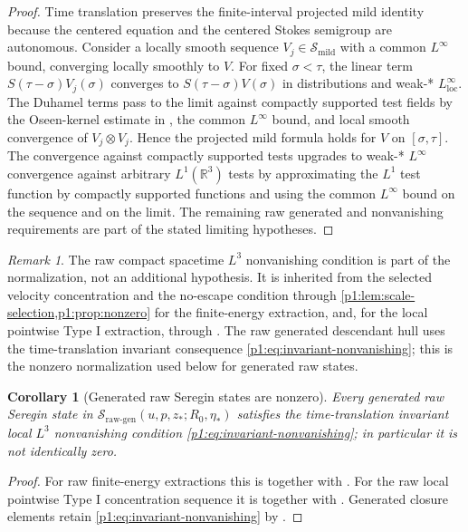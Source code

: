 \documentclass[11pt]{amsart}
\theoremstyle{plain}
\newtheorem{corollary}[corollary]{Corollary}
\theoremstyle{definition}
\theoremstyle{remark}
\newtheorem{remark}[remark]{Remark}
\numberwithin{equation}{section}
\newcommand{\R}{\mathbb R}
\newcommand{\loc}{\mathrm{loc}}
\newcommand{\calS}{\mathcal S}
\begin{document}
\begin{proof}
Time translation preserves the finite-interval projected mild identity because
the centered equation and the centered Stokes semigroup are autonomous.
Consider a locally smooth sequence \(V_j\in\calS_{\mathrm{mild}}\) with a common
\(L^\infty\) bound, converging locally smoothly to \(V\).  For fixed
\(\sigma<\tau\), the linear term \(S(\tau-\sigma)V_j(\sigma)\) converges to
\(S(\tau-\sigma)V(\sigma)\) in distributions and weak-* \(L^\infty_{\loc}\).
The Duhamel terms pass to the limit against compactly supported test fields by
the Oseen-kernel estimate in , the common
\(L^\infty\) bound, and local smooth convergence of \(V_j\otimes V_j\).  Hence
the projected mild formula holds for \(V\) on \([\sigma,\tau]\).  The
convergence against compactly supported tests upgrades to weak-* \(L^\infty\)
convergence against arbitrary \(L^1(\R^3)\) tests by approximating the
\(L^1\) test function by compactly supported functions and using the common
\(L^\infty\) bound on the sequence and on the limit.  The remaining
raw generated and nonvanishing requirements are part of the stated limiting
hypotheses.
\end{proof}

\begin{remark}
The raw compact spacetime \(L^3\) nonvanishing condition is part of the
normalization, not an additional hypothesis.  It is inherited from the
selected velocity concentration and the no-escape condition through
\cref{p1:lem:scale-selection,p1:prop:nonzero} for the finite-energy extraction,
and, for the local pointwise Type I extraction, through
.
The raw generated descendant hull uses the
time-translation invariant consequence \eqref{p1:eq:invariant-nonvanishing};
this is the nonzero normalization used below for generated raw states.
\end{remark}

\begin{corollary}[Generated raw Seregin states are nonzero]
\label{p1:cor:normalized-nonzero}
Every generated raw Seregin state in
\(\calS_{\mathrm{raw\text{-}gen}}(u,p,z_*;R_0,\eta_*)\) satisfies the
time-translation invariant local \(L^3\) nonvanishing condition
\eqref{p1:eq:invariant-nonvanishing}; in particular it is not identically
zero.
\end{corollary}

\begin{proof}
For raw finite-energy extractions this is
 together
with .  For the
raw local pointwise Type I concentration sequence it is
together with .
Generated closure elements retain
\eqref{p1:eq:invariant-nonvanishing} by
.
\end{proof}
\end{document}
